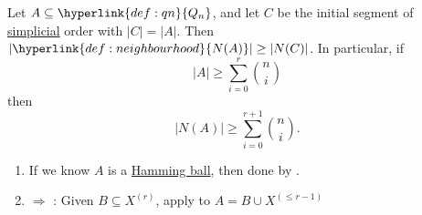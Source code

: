 \documentclass{article}
\let\subset\subseteq
\begin{document}
\begin{nthm}\label{thm:harper1}
  Let $A \subset \hyperlink{def:qn}{Q_n}$, and let $C$ be the initial segment of \hyperlink{def:simplicial}{simplicial} order with $|C| = |A|$.
  Then $|\hyperlink{def:neighbourhood}{N(A)}| \geq |N(C)|$.
  In particular, if
  \begin{equation*}|A| \geq \sum_{i=0}^r \binom{n}{i}\end{equation*}
  then
  \begin{equation*}|N(A)| \geq \sum_{i=0}^{r+1} \binom{n}{i}.\end{equation*}
\end{nthm}
\begin{remark}\leavevmode
  \begin{enumerate}[label=\arabic*.]
    \item If we know $A$ is a \hyperlink{def:hamming}{Hamming ball}, then done by .
    \item {} $\Rightarrow$ : Given $B \subset X^{(r)}$, apply  to $A = B \cup X^{(\leq r-1)}$
  \end{enumerate}
\end{remark}
\end{document}
